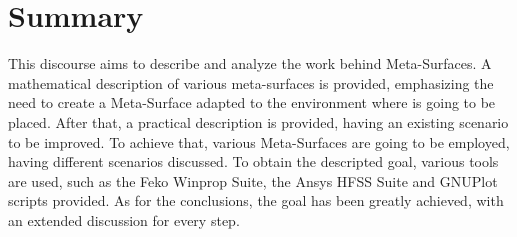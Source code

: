 \chapter*{Summary} %
\label{sommario}


This discourse aims to describe and analyze the work behind Meta-Surfaces. A mathematical description of various meta-surfaces is provided, emphasizing the need to create a Meta-Surface adapted to the environment where is going to be placed. After that, a practical description is provided, having an existing scenario to be improved. To achieve that, various Meta-Surfaces are going to be employed, having different scenarios discussed. To obtain the descripted goal, various tools are used, such as the Feko Winprop Suite, the Ansys HFSS Suite and GNUPlot scripts provided. As for the conclusions, the goal has been greatly achieved, with an extended discussion for every step.

